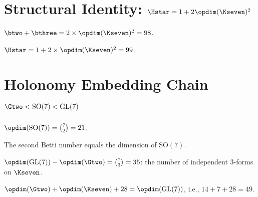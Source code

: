 \section{Structural Identity: $\Hstar = 1 + 2 \opdim(\Kseven)^2$}

\begin{theorem}\label{thm:betti_pair_K7_sq}
    \leanok
    $\btwo + \bthree = 2 \times \opdim(\Kseven)^2 = 98$.
\end{theorem}

\begin{theorem}\label{thm:H_star_structural}
    \leanok
    $\Hstar = 1 + 2 \times \opdim(\Kseven)^2 = 99$.
\end{theorem}

\section{Holonomy Embedding Chain $\Gtwo < \mathrm{SO}(7) < \mathrm{GL}(7)$}

\begin{definition}\label{def:dim_SO7}
    \leanok
    $\opdim(\mathrm{SO}(7)) = \binom{7}{2} = 21$.
\end{definition}

\begin{theorem}[$\opdim(\mathrm{SO}(7)) = \btwo$]\label{thm:SO7_eq_b2}
    \leanok
    The second Betti number equals the dimension of $\mathrm{SO}(7)$.
\end{theorem}

\begin{theorem}[Codimension $\mathrm{GL}(7)/\Gtwo = \binom{7}{3}$]\label{thm:codim_3forms}
    \leanok
    $\opdim(\mathrm{GL}(7)) - \opdim(\Gtwo) = \binom{7}{3} = 35$: the number of
    independent 3-forms on $\Kseven$.
\end{theorem}

\begin{theorem}\label{thm:chain_additive}
    \leanok
    $\opdim(\Gtwo) + \opdim(\Kseven) + 28 = \opdim(\mathrm{GL}(7))$, i.e., $14 + 7 + 28 = 49$.
\end{theorem}

